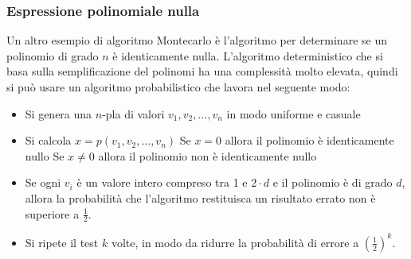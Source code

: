     \subsubsection{Espressione polinomiale nulla}
        Un altro esempio di algoritmo Montecarlo è l'algoritmo per determinare se un polinomio di grado $n$ è identicamente nulla. L'algoritmo deterministico che si basa sulla semplificazione del polinomi ha una complessità molto elevata, quindi si può usare un algoritmo probabilistico che lavora nel seguente modo:
        \begin{itemize}
            \item Si genera una $n$-pla di valori $v_1,v_2,\dots,v_n$ in modo uniforme e casuale
            \item Si calcola $x=p(v_1,v_2,\dots,v_n)$
            \subitem Se $x=0$ allora il polinomio è identicamente nullo
            \subitem Se $x\neq 0$ allora il polinomio non è identicamente nullo
            \item Se ogni $v_i$ è un valore intero compreso tra 1 e $2\cdot d$ e il polinomio è di grado $d$, allora la probabilità che l'algoritmo restituisca un risultato errato non è superiore a $\frac{1}{2}$.
            \item Si ripete il test $k$ volte, in modo da ridurre la probabilità di errore a $\left(\frac{1}{2}\right)^k$.
        \end{itemize}
